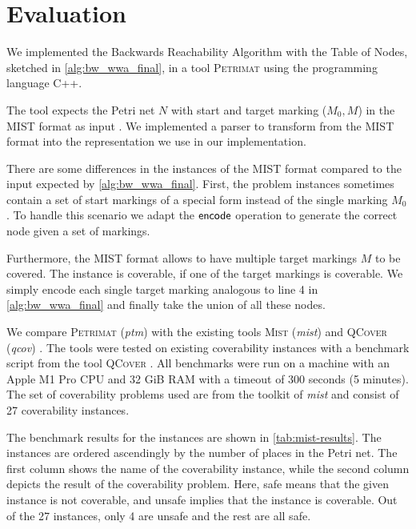 \chapter{Evaluation}\label{chapter:evaluation}
We implemented the Backwards Reachability Algorithm with the Table of Nodes, sketched in \autoref{alg:bw_wwa_final}, in a tool \textsc{Petrimat} using the programming language C++. 

The tool expects the Petri net $N$ with start and target marking ($M_{0},M$) in the MIST format as input \cite{ganty_15}. We implemented a parser to transform from the MIST format into the representation we use in our implementation. 

There are some differences in the instances of the MIST format compared to the input expected by \autoref{alg:bw_wwa_final}. First, the problem instances sometimes contain a set of start markings of a special form instead of the single marking $M_{0}$. To handle this scenario we adapt the $\operatorname{\textsf{encode}}$ operation to generate the correct node given a set of markings. 

Furthermore, the MIST format allows to have multiple target markings $M$ to be covered. The instance is coverable, if one of the target markings is coverable. We simply encode each single target marking analogous to line 4 in \autoref{alg:bw_wwa_final} and finally take the union of all these nodes.

We compare \textsc{Petrimat} (\textit{ptm}) with the existing tools \textsc{Mist} (\textit{mist}) \cite{ganty_15} and \textsc{QCover} (\textit{qcov})  \cite{blondin_15}. 
The tools were tested on existing coverability instances with a benchmark script from the tool \textsc{QCover} \cite{blondin_15}.  All benchmarks were run on a machine with an Apple M1 Pro CPU and 32 GiB RAM with a timeout of 300 seconds (5 minutes). 
The set of coverability problems used are from the toolkit of \textit{mist} and consist of 27 coverability instances. 

\bigbreak

The benchmark results for the instances are shown in \autoref{tab:mist-results}.
The instances are ordered ascendingly by the number of places in the Petri net. The first column shows the name of the coverability instance, while the second column depicts the result of the coverability problem. Here, safe means that the given instance is not coverable, and unsafe implies that the instance is coverable.
Out of the 27 instances, only 4 are unsafe and the rest are all safe. 

